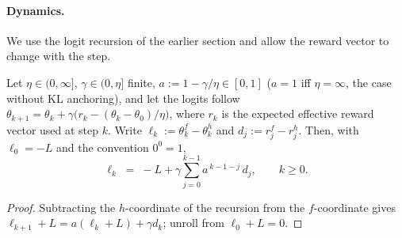 \paragraph{Dynamics.} We use the logit recursion of the earlier section and
allow the reward vector to change with the step.

\begin{lemma}\label{lem:audit-logodds}
Let $\eta\in(0,\infty]$, $\gamma\in(0,\eta]$ finite, $a:=1-\gamma/\eta\in[0,1]$
($a=1$ iff $\eta=\infty$, the case without KL anchoring), and let the logits
follow $\theta_{k+1}=\theta_k+\gamma\bigl(r_k-(\theta_k-\theta_0)/\eta\bigr)$,
where $r_k$ is the expected effective reward vector used at step $k$. Write
$\ell_k:=\theta_k^{f}-\theta_k^{h}$ and $d_j:=r_j^{f}-r_j^{h}$. Then, with
$\ell_0=-L$ and the convention $0^0=1$,
\begin{equation}\label{eq:audit-logodds}
  \ell_k \;=\; -L+\gamma\sum_{j=0}^{k-1}a^{\,k-1-j}\,d_j ,\qquad k\ge 0 .
\end{equation}
\end{lemma}
\begin{proof}
Subtracting the $h$-coordinate of the recursion from the $f$-coordinate gives
$\ell_{k+1}+L=a(\ell_k+L)+\gamma d_k$; unroll from $\ell_0+L=0$.
\end{proof}


